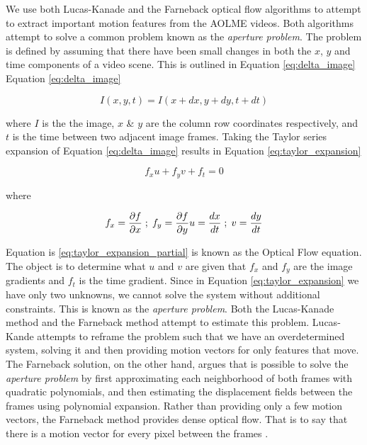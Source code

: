 We use both Lucas-Kanade \cite{lucas1981iterative} and the Farneback
\cite{farneback2003two}  optical flow algorithms to attempt to extract
important motion features from the AOLME videos. Both algorithms attempt to solve
a common problem known as the \textit{aperture problem}. The problem is defined
by assuming that there have been small changes in both the $x$, $y$ and time components
of a video scene. This is outlined in Equation \ref{eq:delta_image}
Equation \ref{eq:delta_image}

\begin{equation}
I(x,y,t) = I(x+dx, y+dy, t+dt)
\label{eq:delta_image}
\end{equation}

where $I$ is the the image, $x$ \& $y$ are the column row coordinates
respectively, and $t$ is the time between two adjacent image frames. Taking the
Taylor series expansion of Equation \ref{eq:delta_image} results in Equation
\ref{eq:taylor_expansion}


\begin{equation}
f_x u + f_y v + f_t = 0
\label{eq:taylor_expansion}
\end{equation}

where

\begin{equation}
f_x = \frac{\partial f}{\partial x} \; ; \; f_y = \frac{\partial f}{\partial y} \\
u = \frac{dx}{dt} \; ; \; v = \frac{dy}{dt}
\label{eq:taylor_expansion_partial}
\end{equation}

 Equation is \ref{eq:taylor_expansion_partial} is known as the Optical Flow
 equation. The object is to determine what $u$ and $v$ are given that $f_x$ and
 $f_y$ are the image gradients and $f_t$ is the time gradient. Since in Equation
 \ref{eq:taylor_expansion} we have only two unknowns, we cannot solve the system
 without additional constraints. This is known as the \textit{aperture problem}.
 Both the Lucas-Kanade method and the Farneback method attempt to estimate this
 problem. Lucas-Kande attempts to reframe the problem such that we have an
 overdetermined system, solving it and then providing motion vectors for only
 features that move. The Farneback solution, on the other hand, argues that is
 possible to solve the \textit{aperture problem} by first approximating each
 neighborhood of both frames with quadratic polynomials, and then estimating the
 displacement fields between the frames using polynomial expansion. Rather than
 providing only a few motion vectors, the Farneback method provides dense
 optical flow. That is to say that there is a motion vector for every pixel
 between the frames \cite{farneback2003two}.

